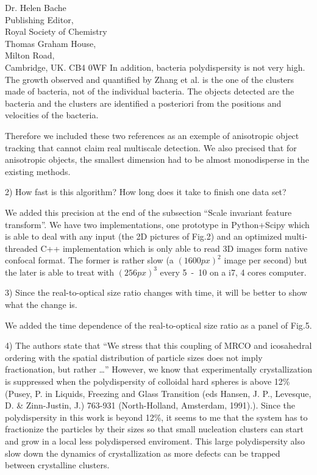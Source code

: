 \documentclass[a4paper, rebuttal, parskip=true, firsthead=false, fromemail=true, foldmarks=false]{scrlttr2}
\begin{document}
\begin{letter}{Dr. Helen Bache\\
Publishing Editor,\\
Royal Society of Chemistry\\
Thomas Graham House,\\
Milton Road,\\
Cambridge, UK. CB4 0WF}
In addition, bacteria polydispersity is not very high. The growth observed and quantified by Zhang et al. is the one of the clusters made of bacteria, not of the individual bacteria. The objects detected are the bacteria and the clusters are identified a posteriori from the positions and velocities of the bacteria.

Therefore we included these two references as an exemple of anisotropic object tracking that cannot claim real multiscale detection. We also precised that for anisotropic objects, the smallest dimension had to be almost monodisperse in the existing methods.

\begin{quotationi}
2)      How fast is this algorithm? How long does it take to finish one data set?
\end{quotationi}

We added this precision at the end of the subsection ``Scale invariant feature transform''. We have two implementations, one prototype in Python+Scipy which is able to deal with any input (the 2D pictures of Fig.2) and an optimized multi-threaded C++ implementation which is only able to read 3D images form native confocal format. The former is rather slow (a $(\unit{1600}{px})^2$ image per second) but the later is able to treat with $(\unit{256}{px})^3$ every \unit{5-10}{\second} on a i7, 4 cores computer.

\begin{quotationi}
3)      Since the real-to-optical size ratio changes with time, it will be better to show what the change is.
\end{quotationi}

We added the time dependence of the real-to-optical size ratio as a panel of Fig.5.

\begin{quotationi}4) The authors state that ``We stress that this coupling of MRCO and icosahedral ordering with the spatial distribution of particle sizes does not imply fractionation, but rather \ldots'' However, we know that experimentally crystallization is suppressed when the polydispersity of colloidal hard spheres is above 12\% (Pusey, P. in Liquids, Freezing and Glass Transition (eds Hansen, J. P., Levesque, D. \& Zinn-Justin, J.) 763-931 (North-Holland, Amsterdam, 1991).). Since the polydispersity in this work is beyond 12\%, it seems to me that the system has to fractionize the particles by their sizes so that small nucleation clusters can start and grow in a local less polydispersed enviroment. This large polydispersity also slow down the dynamics of crystallization as more defects can be trapped between crystalline clusters.
\end{quotationi}


\end{letter}
\end{document}
